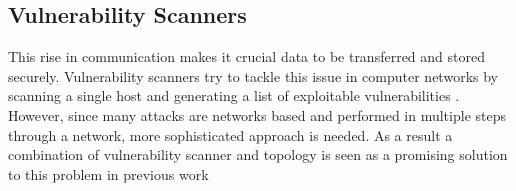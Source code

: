 \subsection{Vulnerability Scanners}
\label{chap:vulnerability_scanners}

This rise in communication makes it crucial data to be transferred and stored securely. Vulnerability scanners try to tackle this issue in computer networks by scanning a single host and generating a list of exploitable vulnerabilities \cite{deraison1999nessus}\cite{farmer1990cops}\cite{clair}. However, since many attacks are networks based and performed in multiple steps through a network, more sophisticated approach is needed. As a result a combination of vulnerability scanner and topology is seen as a promising solution to this problem in previous work \cite{sheyner2002automated}\cite{ingols2006practical}
